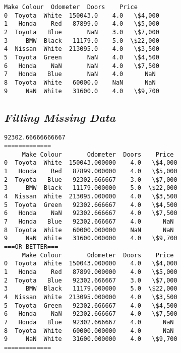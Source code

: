 \documentclass[11pt]{article}
\begin{document}
            \begin{tcolorbox}[breakable, size=fbox, boxrule=.5pt, pad at break*=1mm, opacityfill=0]
\begin{Verbatim}[commandchars=\\\{\}]
     Make Colour  Odometer  Doors    Price
0  Toyota  White  150043.0    4.0   \$4,000
1   Honda    Red   87899.0    4.0   \$5,000
2  Toyota   Blue       NaN    3.0   \$7,000
3     BMW  Black   11179.0    5.0  \$22,000
4  Nissan  White  213095.0    4.0   \$3,500
5  Toyota  Green       NaN    4.0   \$4,500
6   Honda    NaN       NaN    4.0   \$7,500
7   Honda   Blue       NaN    4.0      NaN
8  Toyota  White   60000.0    NaN      NaN
9     NaN  White   31600.0    4.0   \$9,700
\end{Verbatim}
\end{tcolorbox}
        
    \hypertarget{filling-missing-data}{%
\subsection{\texorpdfstring{\textbf{\emph{Filling Missing
Data}}}{Filling Missing Data}}\label{filling-missing-data}}

    \begin{Verbatim}[commandchars=\\\{\}]
92302.66666666667
=============
     Make Colour       Odometer  Doors    Price
0  Toyota  White  150043.000000    4.0   \$4,000
1   Honda    Red   87899.000000    4.0   \$5,000
2  Toyota   Blue   92302.666667    3.0   \$7,000
3     BMW  Black   11179.000000    5.0  \$22,000
4  Nissan  White  213095.000000    4.0   \$3,500
5  Toyota  Green   92302.666667    4.0   \$4,500
6   Honda    NaN   92302.666667    4.0   \$7,500
7   Honda   Blue   92302.666667    4.0      NaN
8  Toyota  White   60000.000000    NaN      NaN
9     NaN  White   31600.000000    4.0   \$9,700
===OR BETTER===
     Make Colour       Odometer  Doors    Price
0  Toyota  White  150043.000000    4.0   \$4,000
1   Honda    Red   87899.000000    4.0   \$5,000
2  Toyota   Blue   92302.666667    3.0   \$7,000
3     BMW  Black   11179.000000    5.0  \$22,000
4  Nissan  White  213095.000000    4.0   \$3,500
5  Toyota  Green   92302.666667    4.0   \$4,500
6   Honda    NaN   92302.666667    4.0   \$7,500
7   Honda   Blue   92302.666667    4.0      NaN
8  Toyota  White   60000.000000    4.0      NaN
9     NaN  White   31600.000000    4.0   \$9,700
=============
    \end{Verbatim}
\end{document}
